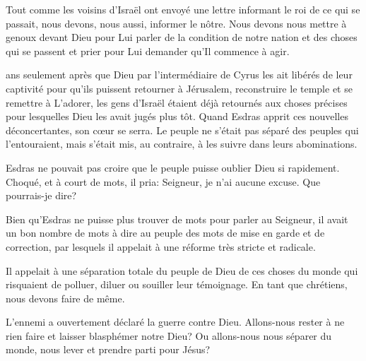 Tout comme les voisins d'Israël ont envoyé une lettre informant
 le roi de ce qui se passait, nous devons, nous aussi, informer le nôtre.
 Nous devons nous mettre à genoux devant Dieu pour Lui parler de la condition
 de notre nation et des choses qui se passent \ocadr{}et prier pour Lui demander
 qu'Il commence à agir. 

\dvrule







 ans seulement après que Dieu
 \ocadr{}par l'intermédiaire de Cyrus\fcadr{} les ait libérés de leur captivité
 pour qu'ils puissent retourner à Jérusalem,
 reconstruire le temple et se remettre à L'adorer,
 les gens d'Israël étaient déjà retournés aux choses précises
 pour lesquelles Dieu les avait jugés plus tôt.
 Quand Esdras apprit ces nouvelles déconcertantes, son cœur se serra.
 Le peuple ne s'était pas séparé des peuples qui l'entouraient,
 mais s'était mis, au contraire, à les suivre dans leurs abominations.

Esdras ne pouvait pas croire que le peuple puisse oublier Dieu si rapidement.
 Choqué, et à court de mots, il pria\space: \og Seigneur, je n'ai aucune excuse.
 Que pourrais-je dire? \fg{}

Bien qu'Esdras ne puisse plus trouver de mots pour parler au Seigneur,
 il avait un bon nombre de mots à dire au peuple \ocadr{}des mots de mise en garde
 et de correction, par lesquels il appelait à une réforme très stricte
 et radicale.

Il appelait à une séparation totale du peuple de Dieu de ces choses du monde
 qui risquaient de polluer, diluer ou souiller leur témoignage.
 En tant que chrétiens, nous devons faire de même. 



L'ennemi a ouvertement déclaré la guerre contre Dieu.
 Allons-nous rester à ne rien faire et laisser blasphémer notre Dieu?
 Ou allons-nous nous séparer du monde, nous lever et prendre parti pour Jésus? 

